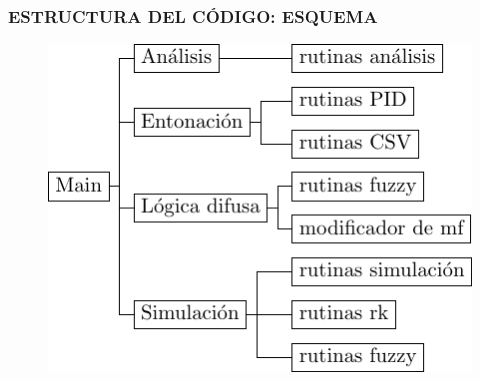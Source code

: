 \documentclass[usenames,xcolor={dvipsnames, table}]{beamer}
\begin{document}
\begin{frame}
	\frametitle{ESTRUCTURA DEL CÓDIGO: ESQUEMA}
	\vspace{20pt}
	\begin{figure}
		\includegraphics[width=0.9\linewidth]{imagenes/estructuraMain.pdf}
	\end{figure}
\end{frame}
\end{document}
